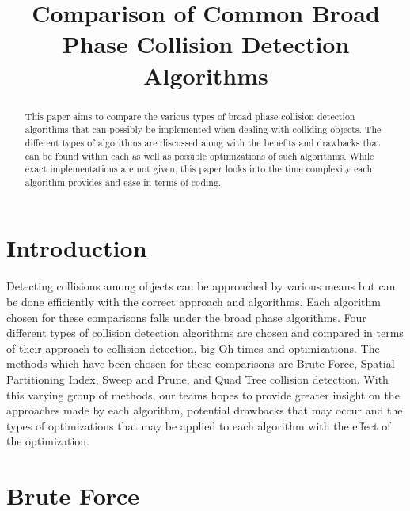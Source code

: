 \documentclass[conference]{IEEEtran}
\begin{document}
\title{Comparison of Common Broad Phase Collision Detection Algorithms}

\author{
}

\maketitle

\begin{abstract}
This paper aims to compare the various types of broad phase collision detection algorithms that can possibly be implemented when dealing with colliding objects. The different types of algorithms are discussed along with the benefits and drawbacks that can be found within each as well as possible optimizations of such algorithms. While exact implementations are not given, this paper looks into the time complexity each algorithm provides and ease in terms of coding.
\end{abstract}

\section{Introduction}
Detecting collisions among objects can be approached by various means but can be done efficiently with the correct approach and algorithms. Each algorithm chosen for these comparisons falls under the broad phase algorithms. Four different types of collision detection algorithms are chosen and compared in terms of their approach to collision detection, big-Oh times and optimizations. The methods which have been chosen for these comparisons are Brute Force, Spatial Partitioning Index, Sweep and Prune, and Quad Tree collision detection. With this varying group of methods, our teams hopes to provide greater insight on the approaches made by each algorithm, potential drawbacks that may occur and the types of optimizations that may be applied to each algorithm with the effect of the optimization.

\section{Brute Force}
\end{document}
